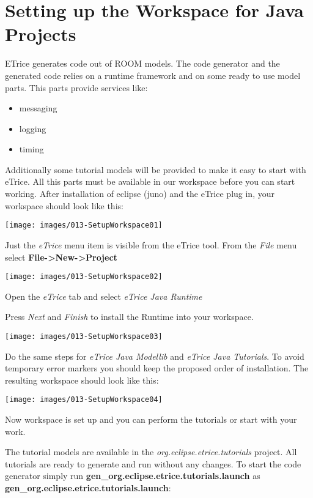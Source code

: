 \chapter{Setting up the Workspace for Java Projects}

ETrice generates code out of ROOM models. The code generator and the generated code relies on a runtime framework and on some ready to use model parts. This parts provide services like:

\begin{itemize}
\item messaging
\item logging
\item timing
\end{itemize}

Additionally some tutorial models will be provided to make it easy to start with eTrice. All this parts must be available in our workspace before you can start working. After installation of eclipse (juno) and the eTrice plug in, your workspace should look like this:  

\texttt{[image: images/013-SetupWorkspace01]}

Just the \textit{eTrice} menu item is visible from the eTrice tool.
From the \textit{File} menu select \textbf{File->New->Project}

\texttt{[image: images/013-SetupWorkspace02]}

Open the \textit{eTrice} tab and select \textit{eTrice Java Runtime}

Press \textit{Next} and \textit{Finish} to install the Runtime into your workspace.

\texttt{[image: images/013-SetupWorkspace03]}

Do the same steps for \textit{eTrice Java Modellib} and \textit{eTrice Java Tutorials}. To avoid temporary error markers you should keep the proposed order of installation. The resulting workspace should look like this:

\texttt{[image: images/013-SetupWorkspace04]}

Now workspace is set up and you can perform the tutorials or start with your work.

The tutorial models are available in the \textit{org.eclipse.etrice.tutorials} project. All tutorials are ready to generate and run without any changes. To start the code generator simply run \textbf{gen\_org.eclipse.etrice.tutorials.launch} as \textbf{gen\_org.eclipse.etrice.tutorials.launch}: 

